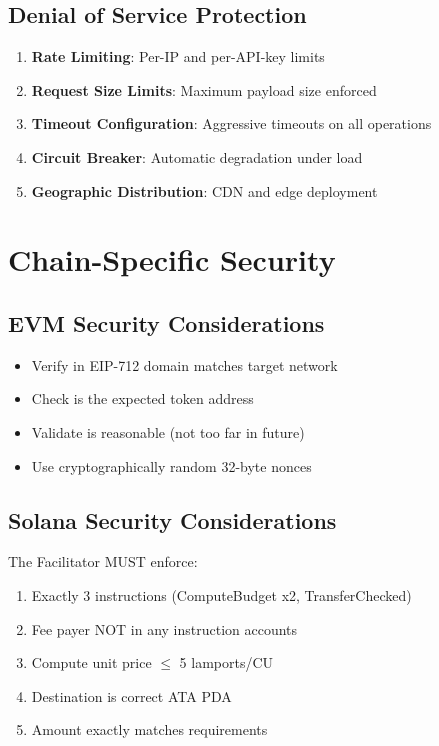 \subsection{Denial of Service Protection}

\begin{enumerate}
    \item \textbf{Rate Limiting}: Per-IP and per-API-key limits
    \item \textbf{Request Size Limits}: Maximum payload size enforced
    \item \textbf{Timeout Configuration}: Aggressive timeouts on all operations
    \item \textbf{Circuit Breaker}: Automatic degradation under load
    \item \textbf{Geographic Distribution}: CDN and edge deployment
\end{enumerate}

\section{Chain-Specific Security}
\label{sec:chain-security}

\subsection{EVM Security Considerations}

\begin{securitybox}
\begin{itemize}
    \item Verify  in EIP-712 domain matches target network
    \item Check  is the expected token address
    \item Validate  is reasonable (not too far in future)
    \item Use cryptographically random 32-byte nonces
\end{itemize}
\end{securitybox}

\subsection{Solana Security Considerations}

\begin{securitybox}
The Facilitator MUST enforce:
\begin{enumerate}
    \item Exactly 3 instructions (ComputeBudget x2, TransferChecked)
    \item Fee payer NOT in any instruction accounts
    \item Compute unit price $\leq$ 5 lamports/CU
    \item Destination is correct ATA PDA
    \item Amount exactly matches requirements
\end{enumerate}
\end{securitybox}

